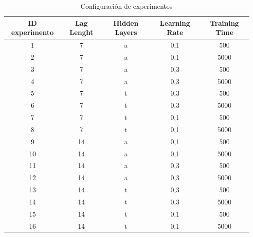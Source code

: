 \documentclass[12pt,a4paper, xcolor=table]{article}
\begin{document}
    \begin{table}[h]
    \begin{tabular}{|c|c|c|c|c|}
    \hline
    \rowcolor[HTML]{DAE8FC} 
    \textbf{ID experimento} & \textbf{Lag Lenght} & \textbf{Hidden Layers} & \textbf{Learning Rate} & \textbf{Training Time} \\ \hline
    1                       & 7                   & a                      & 0,1                    & 500                    \\ \hline
    2                       & 7                   & a                      & 0,1                    & 5000                   \\ \hline
    3                       & 7                   & a                      & 0,3                    & 500                    \\ \hline
    4                       & 7                   & a                      & 0,3                    & 5000                   \\ \hline
    5                       & 7                   & t                      & 0,3                    & 500                    \\ \hline
    6                       & 7                   & t                      & 0,3                    & 5000                   \\ \hline
    7                       & 7                   & t                      & 0,1                    & 500                    \\ \hline
    8                       & 7                   & t                      & 0,1                    & 5000                   \\ \hline
    9                       & 14                  & a                      & 0,1                    & 500                    \\ \hline
    10                      & 14                  & a                      & 0,1                    & 5000                   \\ \hline
    11                      & 14                  & a                      & 0,3                    & 500                    \\ \hline
    12                      & 14                  & a                      & 0,3                    & 5000                   \\ \hline
    13                      & 14                  & t                      & 0,3                    & 500                    \\ \hline
    14                      & 14                  & t                      & 0,3                    & 5000                   \\ \hline
    15                      & 14                  & t                      & 0,1                    & 500                    \\ \hline
    16                      & 14                  & t                      & 0,1                    & 5000                   \\ \hline
    \end{tabular}
    \caption{Configuración de experimentos}
    \end{table}
\end{document}
